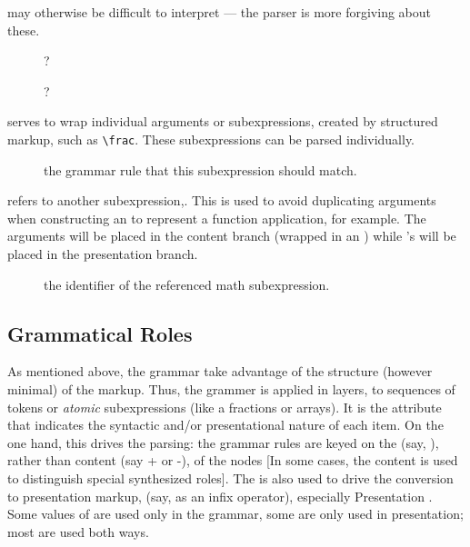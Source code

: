 \documentclass{book}
\begin{document}
\begin{description}
  may otherwise be difficult to interpret --- the parser is more forgiving about these.
  \begin{description}
    \item[] ?
    \item[] ?
  \end{description}
\item[\elementref{XMArg}] serves to wrap individual arguments or subexpressions, created by
  structured markup, such as \verb|\frac|.  These subexpressions can be parsed individually.
  \begin{description}
    \item[] the grammar rule that this subexpression should match.
  \end{description}
\item[\elementref{XMRef}] refers to another subexpression,.  This is used to avoid duplicating
  arguments when constructing an  to represent a function application, for example.  
  The arguments will be placed in the content branch (wrapped in an ) while
  's will be placed in the presentation branch.
  \begin{description}
    \item[] the identifier of the referenced math subexpression.
  \end{description}
\end{description}

\subsection{Grammatical Roles}\label{math.details.roles}
As mentioned above, the grammar take advantage of the structure (however minimal) of the markup.
Thus, the grammer is applied in layers, to sequences of tokens or \emph{atomic} 
subexpressions (like a fractions or arrays). It is the  attribute
that indicates the syntactic and/or presentational nature of each item.
On the one hand, this drives the parsing: the grammar rules are keyed
on the  (say, ), rather than content (say + or -), of the nodes
[In some cases, the content is used to distinguish special synthesized roles].
The  is also used to drive the conversion to presentation markup, 
(say, as an infix operator), especially Presentation \MathML.
Some values of  are used only in the grammar,
some are only used in presentation; most are used both ways.
\end{document}
